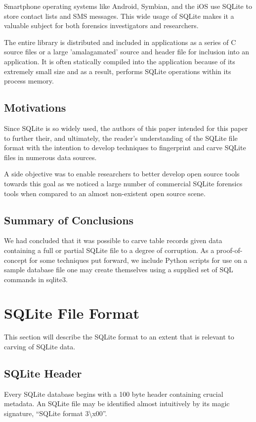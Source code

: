 \documentclass{article}
\begin{document}
Smartphone operating systems like Android, Symbian, and the iOS use SQLite to store contact lists and SMS messages. This wide usage of SQLite makes it a valuable subject for both forensics investigators and researchers. 

The entire library is distributed and included in applications as a series of C source files or a large 'amalagamated' source and header file for inclusion into an application. It is often statically compiled into the application because of its extremely small size and as a result, performs SQLite operations within its process memory.

\subsection{Motivations}
Since SQLite is so widely used, the authors of this paper intended for this paper to further their, and ultimately, the reader's understanding of the SQLite file format with the intention to develop techniques to fingerprint and carve SQLite files in numerous data sources. 

A side objective was to enable researchers to better develop open source tools towards this goal as we noticed a large number of commercial SQLite forensics tools when compared to an almost non-existent open source scene.

\subsection{Summary of Conclusions}
We had concluded that it was possible to carve table records given data containing a full or partial SQLite file to a degree of corruption. As a proof-of-concept for some techniques put forward, we include Python scripts for use on a sample database file one may create themselves using a supplied set of SQL commands in sqlite3.

\section{SQLite File Format}

This section will describe the SQLite format to an extent that is relevant to carving of SQLite data.

\subsection{SQLite Header}

Every SQLite database begins with a 100 byte header containing crucial metadata. An SQLite file may be identified almost intuitively by its magic signature, ``SQLite format 3\textbackslash x00''. \\
\end{document}
